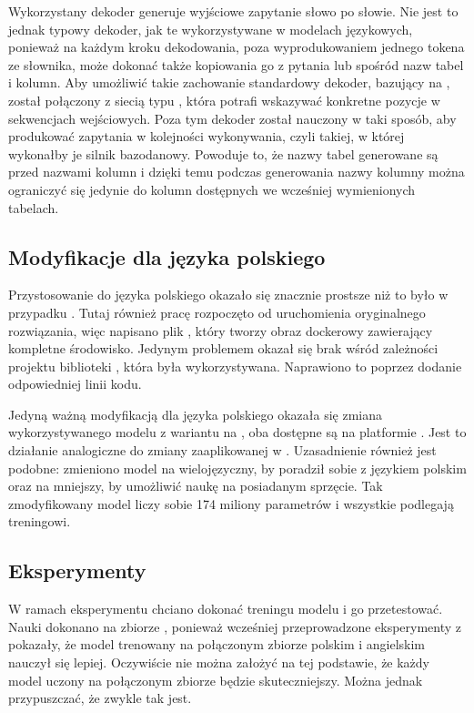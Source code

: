 Wykorzystany dekoder generuje wyjściowe zapytanie słowo po słowie. Nie jest to jednak typowy dekoder, jak te wykorzystywane w modelach językowych, ponieważ na każdym kroku dekodowania, poza wyprodukowaniem jednego tokena ze słownika, może dokonać także kopiowania go z pytania lub spośród nazw tabel i kolumn. Aby umożliwić takie zachowanie standardowy dekoder, bazujący na , został połączony z siecią typu  , która potrafi wskazywać konkretne pozycje w sekwencjach wejściowych. Poza tym dekoder został nauczony w taki sposób, aby produkować zapytania w kolejności wykonywania, czyli takiej, w której wykonałby je silnik bazodanowy. Powoduje to, że nazwy tabel generowane są przed nazwami kolumn i dzięki temu podczas generowania nazwy kolumny można ograniczyć się jedynie do kolumn dostępnych we wcześniej wymienionych tabelach.

\subsection{Modyfikacje dla języka polskiego}
Przystosowanie  do języka polskiego okazało się znacznie prostsze niż to było w przypadku . Tutaj również pracę rozpoczęto od uruchomienia oryginalnego rozwiązania, więc napisano plik , który tworzy obraz dockerowy zawierający kompletne środowisko. Jedynym problemem okazał się brak wśród zależności projektu biblioteki , która była wykorzystywana. Naprawiono to poprzez dodanie odpowiedniej linii kodu.

Jedyną ważną modyfikacją dla języka polskiego okazała się zmiana wykorzystywanego modelu  z wariantu  na , oba dostępne są na platformie . Jest to działanie analogiczne do zmiany zaaplikowanej w . Uzasadnienie również jest podobne: zmieniono model na wielojęzyczny, by poradził sobie z językiem polskim oraz na mniejszy, by umożliwić naukę na posiadanym sprzęcie. Tak zmodyfikowany model  liczy sobie 174 miliony parametrów i wszystkie podlegają treningowi.

\subsection{Eksperymenty}
W ramach eksperymentu chciano dokonać treningu modelu  i go przetestować. Nauki dokonano na zbiorze , ponieważ wcześniej przeprowadzone eksperymenty z  pokazały, że model trenowany na połączonym zbiorze polskim i angielskim nauczył się lepiej. Oczywiście nie można założyć na tej podstawie, że każdy model uczony na połączonym zbiorze będzie skuteczniejszy. Można jednak przypuszczać, że zwykle tak jest.

